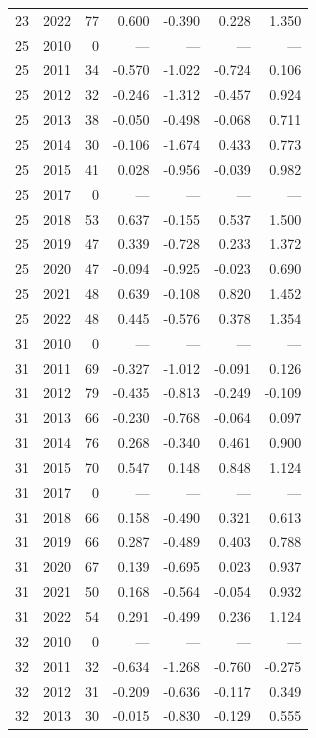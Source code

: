 \begin{longtable}{llrrrrr}
23 & 2022 & 77 & 0.600 & -0.390 & 0.228 & 1.350 \\
25 & 2010 & 0 & --- & --- & --- & --- \\
25 & 2011 & 34 & -0.570 & -1.022 & -0.724 & 0.106 \\
25 & 2012 & 32 & -0.246 & -1.312 & -0.457 & 0.924 \\
25 & 2013 & 38 & -0.050 & -0.498 & -0.068 & 0.711 \\
25 & 2014 & 30 & -0.106 & -1.674 & 0.433 & 0.773 \\
25 & 2015 & 41 & 0.028 & -0.956 & -0.039 & 0.982 \\
25 & 2017 & 0 & --- & --- & --- & --- \\
25 & 2018 & 53 & 0.637 & -0.155 & 0.537 & 1.500 \\
25 & 2019 & 47 & 0.339 & -0.728 & 0.233 & 1.372 \\
25 & 2020 & 47 & -0.094 & -0.925 & -0.023 & 0.690 \\
25 & 2021 & 48 & 0.639 & -0.108 & 0.820 & 1.452 \\
25 & 2022 & 48 & 0.445 & -0.576 & 0.378 & 1.354 \\
31 & 2010 & 0 & --- & --- & --- & --- \\
31 & 2011 & 69 & -0.327 & -1.012 & -0.091 & 0.126 \\
31 & 2012 & 79 & -0.435 & -0.813 & -0.249 & -0.109 \\
31 & 2013 & 66 & -0.230 & -0.768 & -0.064 & 0.097 \\
31 & 2014 & 76 & 0.268 & -0.340 & 0.461 & 0.900 \\
31 & 2015 & 70 & 0.547 & 0.148 & 0.848 & 1.124 \\
31 & 2017 & 0 & --- & --- & --- & --- \\
31 & 2018 & 66 & 0.158 & -0.490 & 0.321 & 0.613 \\
31 & 2019 & 66 & 0.287 & -0.489 & 0.403 & 0.788 \\
31 & 2020 & 67 & 0.139 & -0.695 & 0.023 & 0.937 \\
31 & 2021 & 50 & 0.168 & -0.564 & -0.054 & 0.932 \\
31 & 2022 & 54 & 0.291 & -0.499 & 0.236 & 1.124 \\
32 & 2010 & 0 & --- & --- & --- & --- \\
32 & 2011 & 32 & -0.634 & -1.268 & -0.760 & -0.275 \\
32 & 2012 & 31 & -0.209 & -0.636 & -0.117 & 0.349 \\
32 & 2013 & 30 & -0.015 & -0.830 & -0.129 & 0.555 \\

\end{longtable}

